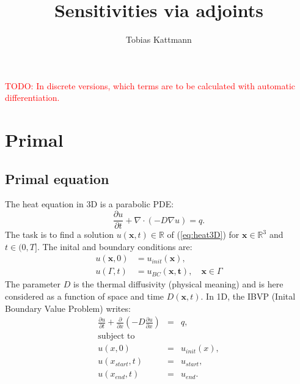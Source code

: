 \documentclass[10pt]{article}
\begin{document}
\title{Sensitivities via adjoints}
\author{Tobias Kattmann}
\maketitle
\tableofcontents
\textcolor{red}{TODO: In discrete versions, which terms are to be calculated with automatic differentiation.}
\section{Primal}
\subsection{Primal equation}
The heat equation in 3D is a parabolic PDE:
\begin{equation}\label{eq:heat3D}
\frac{\partial u}{\partial t} + \nabla\cdot \left(- D\nabla u \right) = q.
\end{equation}
The task is to find a solution $u\left(\mathbf{x}, t\right)\in\mathbb{R}$ of  (\ref{eq:heat3D}) for $\mathbf{x}\in\mathbb{R}^3$ and $t\in(0,T]$. The inital and boundary conditions are:
\begin{align}
u(\mathbf{x},0) & = u_{init}(\mathbf{x}), \\
u(\Gamma,t) & = u_{BC}(\mathbf{x,t}), \quad \mathbf{x}\in\Gamma
\end{align}
The parameter $D$ is the thermal diffusivity (physical meaning) and is here considered as a function of space and time $D\left(\mathbf{x},t\right)$. In 1D, the IBVP (Inital Boundary Value Problem) writes:
\begin{eqnarray}
\frac{\partial u}{\partial t} +\frac{\partial}{\partial x} \left(- D \frac{\partial u}{\partial x}  \right) &=& q, \\
\text{subject to} \\
u(x,0) &=& u_{init}(x), \\
u(x_{start},t)&=& u_{start}, \\
u(x_{end},t) &=& u_{end}.
\end{eqnarray}
\end{document}

